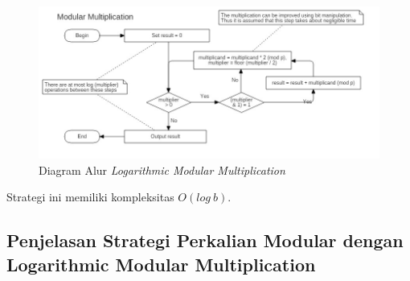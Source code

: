 \begin{figure}
	\Centering
	\includegraphics[angle=90,scale=0.5]{bab2/img/modular-multiplication}
	\caption{Diagram Alur \textit{Logarithmic Modular Multiplication}}
	\label{fig:log_mod_mul}
\end{figure}

Strategi ini memiliki kompleksitas $ O(log\ b) $.

\subsection{Penjelasan Strategi Perkalian Modular dengan Logarithmic Modular Multiplication}


